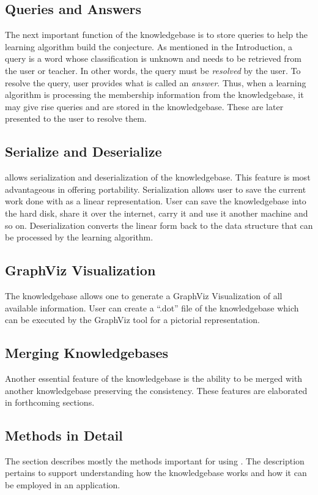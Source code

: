 \subsection*{Queries and Answers} 
The next important function of the knowledgebase is to store queries to help the learning algorithm build the conjecture. As mentioned in the Introduction, a query is a word whose classification is unknown and needs to be retrieved from the user or teacher. In other words, the query must be \emph{resolved} by the user. To resolve the query, user provides what is called an \emph{answer}. Thus, when a learning algorithm is processing the membership information from the knowledgebase, it may give rise queries and are stored in the knowledgebase. These are later presented to the user to resolve them.

\subsection*{Serialize and Deserialize} 
\libalf allows serialization and deserialization of the knowledgebase. This feature is most advantageous in offering portability. Serialization allows user to save the current work done with \libalf as a linear representation. User can save the knowledgebase into the hard disk, share it over the internet, carry it and use it another machine and so on. Deserialization converts the linear form back to the data structure that can be processed by the learning algorithm.

\subsection*{GraphViz Visualization} 
The knowledgebase allows one to generate a GraphViz Visualization of all available information. User can create a ``.dot'' file of the knowledgebase which can be executed by the GraphViz tool for a pictorial representation.

\subsection*{Merging Knowledgebases} 
Another essential feature of the knowledgebase is the ability to be merged with another knowledgebase preserving the consistency. These features are elaborated in forthcoming sections.

\subsection{Methods in Detail}
The section describes mostly the methods important for using \libalf. The description pertains to support understanding how the knowledgebase works and how it can be employed in an application. 
	
